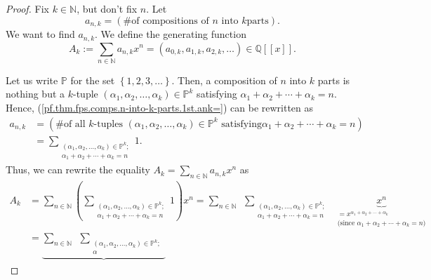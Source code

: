 \begin{proof}
Fix $k\in\mathbb{N}$, but don't fix $n$. Let
\begin{equation}
a_{n,k}=\left(  \text{\# of compositions of }n\text{ into }k\text{
parts}\right)  . \label{pf.thm.fps.comps.n-into-k-parts.1st.ank=}%
\end{equation}
We want to find $a_{n,k}$. We define the generating function%
\begin{equation}
A_{k}:=\sum_{n\in\mathbb{N}}a_{n,k}x^{n}=\left(  a_{0,k},a_{1,k}%
,a_{2,k},\ldots\right)  \in\mathbb{Q}\left[  \left[  x\right]  \right]  .
\label{pf.thm.fps.comps.n-into-k-parts.1st.Ak=}%
\end{equation}

Let us write $\mathbb{P}$ for the set $\left\{  1,2,3,\ldots\right\}  $. Then,
a composition of $n$ into $k$ parts is nothing but a $k$-tuple $\left(
\alpha_{1},\alpha_{2},\ldots,\alpha_{k}\right)  \in\mathbb{P}^{k}$ satisfying
$\alpha_{1}+\alpha_{2}+\cdots+\alpha_{k}=n$. Hence,
(\ref{pf.thm.fps.comps.n-into-k-parts.1st.ank=}) can be rewritten as%
\begin{align}
a_{n,k}  &  =\left(  \text{\# of all }k\text{-tuples }\left(  \alpha
_{1},\alpha_{2},\ldots,\alpha_{k}\right)  \in\mathbb{P}^{k}\text{ satisfying
}\alpha_{1}+\alpha_{2}+\cdots+\alpha_{k}=n\right) \nonumber\\
&  =\sum\limits_{\substack{\left(  \alpha_{1},\alpha_{2},\ldots,\alpha
_{k}\right)  \in\mathbb{P}^{k};\\\alpha_{1}+\alpha_{2}+\cdots+\alpha_{k}=n}}1.
\label{pf.thm.fps.comps.n-into-k-parts.1st.ank=2}%
\end{align}
Thus, we can rewrite the equality $A_{k}=\sum_{n\in\mathbb{N}}a_{n,k}x^{n}$
as
\begin{align*}
A_{k}  &  =\sum_{n\in\mathbb{N}}\left(  \sum\limits_{\substack{\left(
\alpha_{1},\alpha_{2},\ldots,\alpha_{k}\right)  \in\mathbb{P}^{k};\\\alpha
_{1}+\alpha_{2}+\cdots+\alpha_{k}=n}}1\right)  x^{n}=\sum_{n\in\mathbb{N}%
}\ \ \sum\limits_{\substack{\left(  \alpha_{1},\alpha_{2},\ldots,\alpha
_{k}\right)  \in\mathbb{P}^{k};\\\alpha_{1}+\alpha_{2}+\cdots+\alpha_{k}%
=n}}\ \ \underbrace{x^{n}}_{\substack{=x^{\alpha_{1}+\alpha_{2}+\cdots
+\alpha_{k}}\\\text{(since }\alpha_{1}+\alpha_{2}+\cdots+\alpha_{k}=n\text{)}%
}}\\
&  =\underbrace{\sum_{n\in\mathbb{N}}\ \ \sum\limits_{\substack{\left(
\alpha_{1},\alpha_{2},\ldots,\alpha_{k}\right)  \in\mathbb{P}^{k};\\\alpha
}}}
\end{align*}
\end{proof}
